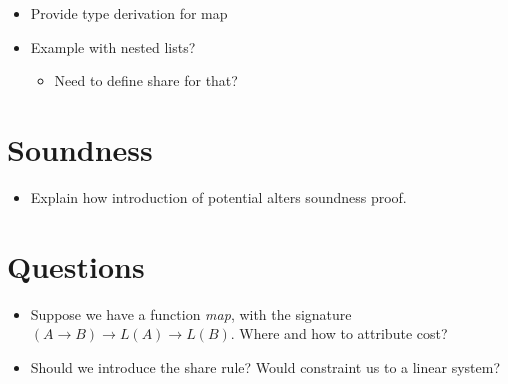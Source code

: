 \begin{itemize}
   \item Provide type derivation for map
   \item Example with nested lists?
      \begin{itemize}
         \item Need to define share for that?
      \end{itemize}
\end{itemize}

\section{Soundness}
\begin{itemize}
   \item Explain how introduction of potential alters soundness proof.
\end{itemize}

\section{Questions}

\begin{itemize}
   \item Suppose we have a function \emph{map}, with the signature \((A \to B) \to L(A) \to L(B)\). Where and how to attribute cost?
   \item Should we introduce the share rule? Would constraint us to a linear system?
\end{itemize}

